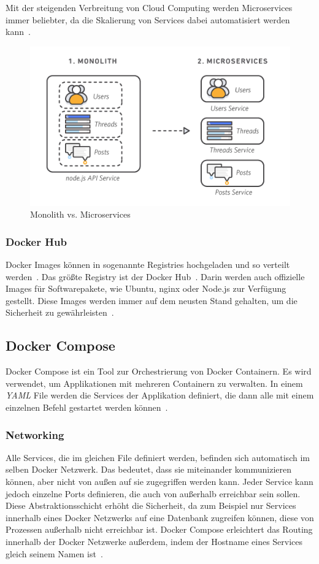  Mit der steigenden Verbreitung von Cloud Computing werden Microservices immer beliebter, da die Skalierung
 von Services dabei automatisiert werden kann~\cite{microservices}.

 \begin{figure}[hbt!]
     \centering
     \includegraphics[scale=0.5]{pics/microservice.png}
     \caption{Monolith vs. Microservices}
 \end{figure}

 \subsubsection{Docker Hub}
 Docker Images können in sogenannte Registries hochgeladen und so verteilt werden~\cite{docker-registry}.
 Das größte Registry ist der Docker Hub~\cite{docker-hub}.
 Darin werden auch offizielle Images für Softwarepakete, wie Ubuntu, nginx oder Node.js zur Verfügung gestellt.
 Diese Images werden immer auf dem neusten Stand gehalten, um die Sicherheit zu
 gewährleisten~\cite{docker-official-images}.

\subsection{Docker Compose}

 Docker Compose ist ein Tool zur Orchestrierung von Docker Containern.
 Es wird verwendet, um Applikationen mit mehreren Containern zu verwalten.
 In einem \textit{YAML} File werden die Services der Applikation definiert, die dann alle mit einem einzelnen
 Befehl gestartet werden können~\cite{docker-compose}.

 \subsubsection{Networking}
 Alle Services, die im gleichen File definiert werden, befinden sich automatisch im selben Docker Netzwerk.
 Das bedeutet, dass sie miteinander kommunizieren können, aber nicht von außen auf sie zugegriffen werden kann.
 Jeder Service kann jedoch einzelne Ports definieren, die auch von außerhalb erreichbar sein sollen.
 Diese Abstraktionsschicht erhöht die Sicherheit, da zum Beispiel nur Services innerhalb eines Docker Netzwerks auf eine
 Datenbank zugreifen können, diese von Prozessen außerhalb nicht erreichbar ist.
 Docker Compose erleichtert das Routing innerhalb der Docker Netzwerke außerdem, indem der Hostname eines Services
 gleich seinem Namen ist~\cite{docker-network}.
